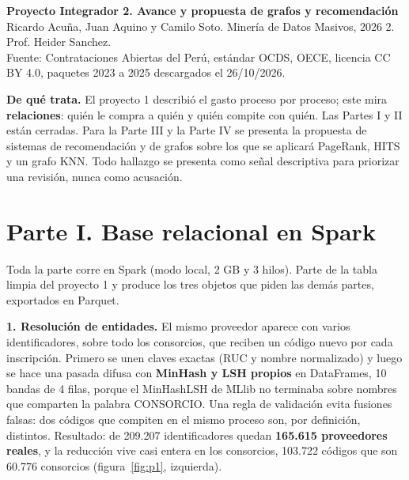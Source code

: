 \documentclass[10pt,a4paper]{article}
\begin{document}
\begin{center}
{\Large\bfseries Proyecto Integrador 2. Avance y propuesta de grafos y recomendación}\\[3pt]
{\small Ricardo Acuña, Juan Aquino y Camilo Soto. Minería de Datos Masivos, 2026 2. Prof. Heider Sanchez.}\\[1pt]
{\small Fuente: Contrataciones Abiertas del Perú, estándar OCDS, OECE, licencia CC BY 4.0, paquetes 2023 a 2025 descargados el 26/10/2026.}
\end{center}

\textbf{De qué trata.} El proyecto 1 describió el gasto proceso por proceso; este mira \textbf{relaciones}: quién le compra a quién y quién compite con quién. Las Partes I y II están cerradas. Para la Parte III y la Parte IV se presenta la propuesta de sistemas de recomendación y de grafos sobre los que se aplicará PageRank, HITS y un grafo KNN. Todo hallazgo se presenta como señal descriptiva para priorizar una revisión, nunca como acusación.

\section*{Parte I. Base relacional en Spark}

Toda la parte corre en Spark (modo local, 2 GB y 3 hilos). Parte de la tabla limpia del proyecto 1 y produce los tres objetos que piden las demás partes, exportados en Parquet.

\textbf{1. Resolución de entidades.} El mismo proveedor aparece con varios identificadores, sobre todo los consorcios, que reciben un código nuevo por cada inscripción. Primero se unen claves exactas (RUC y nombre normalizado) y luego se hace una pasada difusa con \textbf{MinHash y LSH propios} en DataFrames, 10 bandas de 4 filas, porque el MinHashLSH de MLlib no terminaba sobre nombres que comparten la palabra CONSORCIO. Una regla de validación evita fusiones falsas: dos códigos que compiten en el mismo proceso son, por definición, distintos. Resultado: de 209.207 identificadores quedan \textbf{165.615 proveedores reales}, y la reducción vive casi entera en los consorcios, 103.722 códigos que son 60.776 consorcios (figura~\ref{fig:p1}, izquierda).
\end{document}
